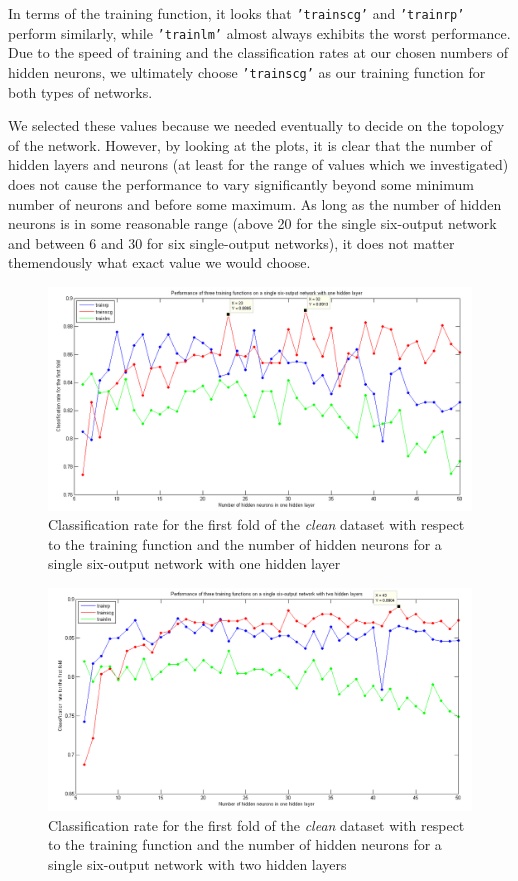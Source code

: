 \documentclass[a4paper]{article}
\begin{document}
In terms of the training function, it looks that \texttt{'trainscg'} and \texttt{'trainrp'} perform similarly, while \texttt{'trainlm'} almost always exhibits the worst performance. Due to the speed of training and the classification rates at our chosen numbers of hidden neurons, we ultimately choose \texttt{'trainscg'} as our training function for both types of networks.\medskip

We selected these values because we needed eventually to decide on the topology of the network. However, by looking at the plots, it is clear that the number of hidden layers and neurons (at least for the range of values which we investigated) does not cause the performance to vary significantly beyond some minimum number of neurons and before some maximum. As long as the number of hidden neurons is in some reasonable range (above 20 for the single six-output network and between 6 and 30 for six single-output networks), it does not matter themendously what exact value we would choose.

\begin{figure}[!ht]
\center
\includegraphics[width=1\columnwidth]{multiOutput1layer}
\caption{Classification rate for the first fold of the \emph{clean} dataset with respect to the training function and the number of hidden neurons for a single six-output network with one hidden layer}
\label{multiOutput1layer}
\end{figure}

\begin{figure}[!ht]
\center
\includegraphics[width=1\columnwidth]{multiOutput2layer}
\caption{Classification rate for the first fold of the \emph{clean} dataset with respect to the training function and the number of hidden neurons for a single six-output network with two hidden layers}
\label{multiOutput2layer}
\end{figure}
\end{document}
